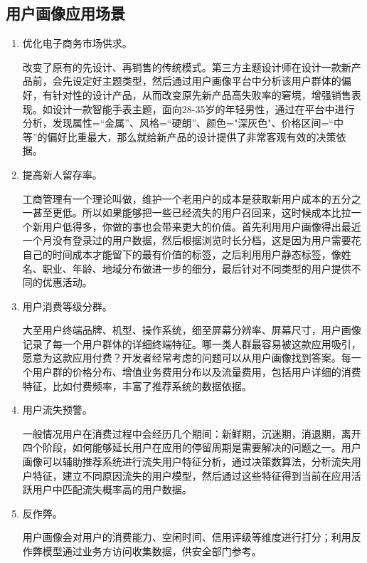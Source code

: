 		\subsection{用户画像应用场景}
		\begin{enumerate}[(1)]
		\item 优化电子商务市场供求。

		改变了原有的先设计、再销售的传统模式。第三方主题设计师在设计一款新产品前，会先设定好主题类型，然后通过用户画像平台中分析该用户群体的偏好，有针对性的设计产品，从而改变原先新产品高失败率的窘境，增强销售表现。如设计一款智能手表主题，面向28-35岁的年轻男性，通过在平台中进行分析，发现属性=“金属”、风格=“硬朗”、颜色="深灰色"、价格区间=“中等”的偏好比重最大，那么就给新产品的设计提供了非常客观有效的决策依据。
				
		\item 提高新人留存率。

		工商管理有一个理论叫做，维护一个老用户的成本是获取新用户成本的五分之一甚至更低。所以如果能够把一些已经流失的用户召回来，这时候成本比拉一个新用户低得多，你做的事也会带来更大的价值。首先利用用户画像得出最近一个月没有登录过的用户数据，然后根据浏览时长分档，这是因为用户需要花自己的时间成本才能留下的最有价值的标签，之后利用用户静态标签，像姓名、职业、年龄、地域分布做进一步的细分，最后针对不同类型的用户提供不同的优惠活动。
				
		\item 用户消费等级分群。

		大至用户终端品牌、机型、操作系统，细至屏幕分辨率、屏幕尺寸，用户画像记录了每一个用户群体的详细终端特征。哪一类人群最容易被这款应用吸引，愿意为这款应用付费？开发者经常考虑的问题可以从用户画像找到答案。每一个用户群的价格分布、增值业务费用分布以及流量费用，包括用户详细的消费特征，比如付费频率，丰富了推荐系统的数据依据。
				
		\item 用户流失预警。

		一般情况用户在消费过程中会经历几个期间：新鲜期，沉迷期，消退期，离开四个阶段，如何能够延长用户在应用的停留周期是需要解决的问题之一。用户画像可以辅助推荐系统进行流失用户特征分析，通过决策数算法，分析流失用户特征，建立不同原因流失的用户模型，然后通过这些特征得到当前在应用活跃用户中匹配流失概率高的用户数据。
				
		\item 反作弊。

		用户画像会对用户的消费能力、空闲时间、信用评级等维度进行打分；利用反作弊模型通过业务方访问收集数据，供安全部门参考。
		\end{enumerate}

